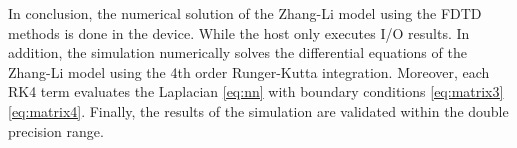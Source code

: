 \vspace{4.0em}

In conclusion, the numerical solution of the Zhang-Li model using the FDTD methods is done in the device. While the host only executes I/O results. In addition, the simulation numerically solves the differential equations of the Zhang-Li model using the 4th order Runger-Kutta integration. Moreover, each RK4 term evaluates the Laplacian \ref{eq:nn} with boundary conditions \ref{eq:matrix3} \ref{eq:matrix4}. Finally, the results of the simulation are validated within the double precision range.




